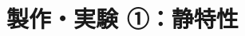 \documentclass[uplatex,a4paper,11pt,oneside,openany]{jsbook}
\begin{document}

\section{製作・実験 ①：静特性}
\end{document}
